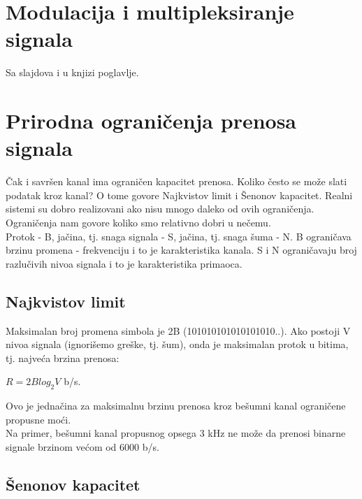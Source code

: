 \documentclass{article} %
\begin{document}
\section{Modulacija i multipleksiranje signala}
Sa slajdova i u knjizi poglavlje.


\section{Prirodna ograničenja prenosa signala}
Čak i savršen kanal ima ograničen kapacitet prenosa.
Koliko često se može slati podatak kroz kanal? O tome govore Najkvistov limit i Šenonov kapacitet. Realni sistemi su dobro realizovani ako nisu mnogo daleko od ovih ograničenja. Ograničenja nam govore koliko smo relativno dobri u nečemu.\\
Protok - B, jačina, tj. snaga signala - S, jačina, tj. snaga šuma - N. B ograničava brzinu promena - frekvenciju i to je karakteristika kanala. S i N ograničavaju broj razlučivih nivoa signala i to je karakteristika primaoca.\subsection{Najkvistov limit}
Maksimalan broj promena simbola je 2B (101010101010101010..). Ako postoji V nivoa signala (ignorišemo greške, tj. šum), onda je maksimalan protok u bitima, tj. najveća brzina prenosa:
\begin{center}
 $ R=2B log_{2} V$  b/s.
\end{center}
Ovo je jednačina za maksimalnu brzinu prenosa kroz bešumni kanal ograničene propusne moći. \\
Na primer, bešumni kanal propusnog opsega 3 kHz ne može da prenosi binarne signale brzinom većom od 6000 b/s.

\subsection{Šenonov kapacitet}
\end{document}
